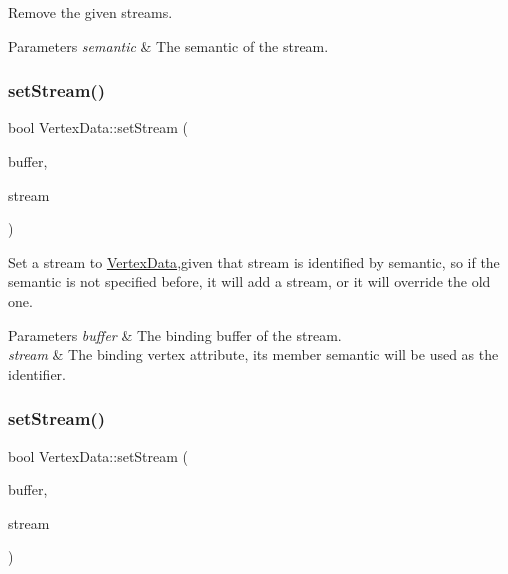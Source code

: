 Remove the given streams. 
\begin{DoxyParams}{Parameters}
{\em semantic} & The semantic of the stream. \\
\hline
\end{DoxyParams}
\mbox{\label{classVertexData_a7089b4ec262edd25dfafaaff2d915a6a}} 
\subsubsection{\texorpdfstring{set\+Stream()}{setStream()}\hspace{0.1cm}{\footnotesize\ttfamily [1/2]}}
{\footnotesize\ttfamily bool Vertex\+Data\+::set\+Stream (\begin{DoxyParamCaption}\item[{\hyperlink{classVertexBuffer}{Vertex\+Buffer} $\ast$}]{buffer,  }\item[{const \hyperlink{structVertexStreamAttribute}{Vertex\+Stream\+Attribute} \&}]{stream }\end{DoxyParamCaption})}

Set a stream to \hyperlink{classVertexData}{Vertex\+Data},given that stream is identified by semantic, so if the semantic is not specified before, it will add a stream, or it will override the old one. 
\begin{DoxyParams}{Parameters}
{\em buffer} & The binding buffer of the stream. \\
\hline
{\em stream} & The binding vertex attribute, its member semantic will be used as the identifier. \\
\hline
\end{DoxyParams}
\mbox{\label{classVertexData_a7089b4ec262edd25dfafaaff2d915a6a}} 
\subsubsection{\texorpdfstring{set\+Stream()}{setStream()}\hspace{0.1cm}{\footnotesize\ttfamily [2/2]}}
{\footnotesize\ttfamily bool Vertex\+Data\+::set\+Stream (\begin{DoxyParamCaption}\item[{\hyperlink{classVertexBuffer}{Vertex\+Buffer} $\ast$}]{buffer,  }\item[{const \hyperlink{structVertexStreamAttribute}{Vertex\+Stream\+Attribute} \&}]{stream }\end{DoxyParamCaption})}

